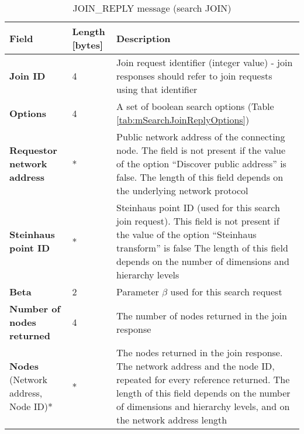 \begin{table}[H]
\scriptsize
\begin{center}
\begin{tabular}{p{3.3cm} p{1.7cm} p{9.5cm}}
	\hline
	\textbf{Field}						& \textbf{Length} [bytes]				& \textbf{Description}				\\[1mm]
    \hline
    \textbf{Join ID}					& 4										& Join request identifier (integer value) - join responses should refer to join requests using that identifier					\\[1.5mm]
	\textbf{Options}					& 4										& A set of boolean search options (Table \ref{tab:mSearchJoinReplyOptions})				\\[1.5mm]
	\textbf{Requestor network address}	\newline [Optional]		& *				& Public network address of the connecting node. The field is not present if the value of the option ``Discover public address'' is false. \newline * The length of this field depends on the underlying network protocol 					\\[1.5mm]
	\textbf{Steinhaus point ID} \newline [optional]		& *						& Steinhaus point ID (used for this search join request). This field is not present if the value of the option ``Steinhaus transform'' is false \newline * The length of this field depends on the number of dimensions and hierarchy levels					\\[1.5mm]	
	\textbf{Beta}						& 2										& Parameter $\beta$ used for this search request					\\[1.5mm]	
	\textbf{Number of nodes returned}	& 4										& The number of nodes returned in the join response					\\[1.5mm]
	\textbf{Nodes} \newline (Network address, Node ID)*			& *				& The nodes returned in the join response. The network address and the node ID, repeated for every reference returned. \newline * The length of this field depends on the number of dimensions and hierarchy levels, and on the network address length		\\[1.5mm]	
    \hline
\end{tabular}
\end{center}
\caption{JOIN\_REPLY message (search JOIN)}
\label{tab:mSearchJoinReply}
\end{table}

